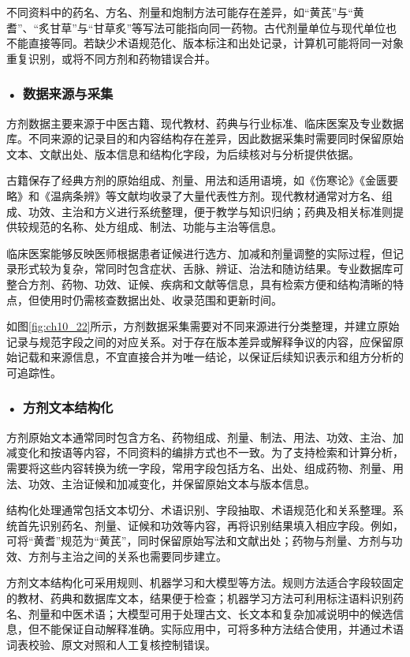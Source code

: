 不同资料中的药名、方名、剂量和炮制方法可能存在差异，如“黄芪”与“黄耆”、“炙甘草”与“甘草炙”等写法可能指向同一药物。古代剂量单位与现代单位也不能直接等同。若缺少术语规范化、版本标注和出处记录，计算机可能将同一对象重复识别，或将不同方剂和药物错误合并。

\subsubsection*{\textbf{• 数据来源与采集}}

方剂数据主要来源于中医古籍、现代教材、药典与行业标准、临床医案及专业数据库。不同来源的记录目的和内容结构存在差异，因此数据采集时需要同时保留原始文本、文献出处、版本信息和结构化字段，为后续核对与分析提供依据。

古籍保存了经典方剂的原始组成、剂量、用法和适用语境，如《伤寒论》《金匮要略》和《温病条辨》等文献均收录了大量代表性方剂。现代教材通常对方名、组成、功效、主治和方义进行系统整理，便于教学与知识归纳；药典及相关标准则提供较规范的名称、处方组成、制法、功能与主治等信息。

临床医案能够反映医师根据患者证候进行选方、加减和剂量调整的实际过程，但记录形式较为复杂，常同时包含症状、舌脉、辨证、治法和随访结果。专业数据库可整合方剂、药物、功效、证候、疾病和文献等信息，具有检索方便和结构清晰的特点，但使用时仍需核查数据出处、收录范围和更新时间。

如图\ref{fig:ch10_22}所示，方剂数据采集需要对不同来源进行分类整理，并建立原始记录与规范字段之间的对应关系。对于存在版本差异或解释争议的内容，应保留原始记载和来源信息，不宜直接合并为唯一结论，以保证后续知识表示和组方分析的可追踪性。

\subsubsection*{\textbf{• 方剂文本结构化}}

方剂原始文本通常同时包含方名、药物组成、剂量、制法、用法、功效、主治、加减变化和按语等内容，不同资料的编排方式也不一致。为了支持检索和计算分析，需要将这些内容转换为统一字段，常用字段包括方名、出处、组成药物、剂量、用法、功效、主治证候和加减变化，并保留原始文本与版本信息。

结构化处理通常包括文本切分、术语识别、字段抽取、术语规范化和关系整理。系统首先识别药名、剂量、证候和功效等内容，再将识别结果填入相应字段。例如，可将“黄耆”规范为“黄芪”，同时保留原始写法和文献出处；药物与剂量、方剂与功效、方剂与主治之间的关系也需要同步建立。

方剂文本结构化可采用规则、机器学习和大模型等方法。规则方法适合字段较固定的教材、药典和数据库文本，结果便于检查；机器学习方法可利用标注语料识别药名、剂量和中医术语；大模型可用于处理古文、长文本和复杂加减说明中的候选信息，但不能保证自动解释准确。实际应用中，可将多种方法结合使用，并通过术语词表校验、原文对照和人工复核控制错误。

